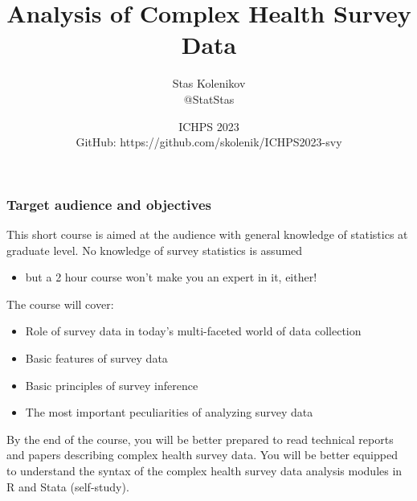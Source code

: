 \documentclass{beamer}
\begin{document}
\title{\textbf{Analysis of Complex Health Survey Data}}
\author[Stas Kolenikov]{Stas Kolenikov \\ @StatStas}
\date[ICHPS 2023]{ICHPS 2023
 \medskip \\ GitHub: https://github.com/skolenik/ICHPS2023-svy }




\begin{frame}
    \titlepage
\end{frame}

\begin{frame}\frametitle{Target audience and objectives}

This short course is aimed at the audience with general knowledge of statistics
at graduate level. No knowledge of survey statistics is assumed
\begin{itemize}
    \item but a 2 hour course won't make you an expert in it, either!
\end{itemize}

The course will cover:
\begin{itemize}
    \item Role of survey data in today's multi-faceted world of data collection
    \item Basic features of survey data
    \item Basic principles of survey inference
    \item The most important peculiarities of analyzing survey data
\end{itemize}

By the end of the course, you will be better prepared to read technical reports
and papers describing complex health survey data. You will be better equipped to
understand the syntax of the complex health survey data analysis modules
in R and Stata (self-study).

\end{frame}
\end{document}
